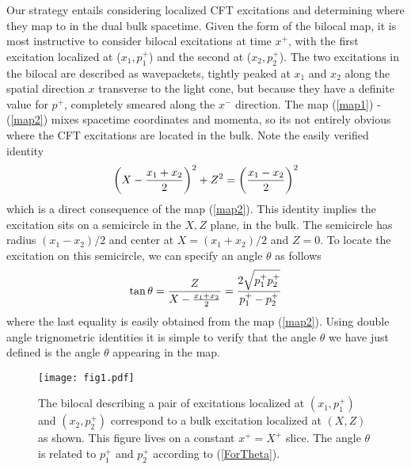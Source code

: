 \documentclass[a4paper,12pt]{article}
\def\bea{\begin{eqnarray}}
\def\eea{\end{eqnarray}}
\begin{document}
Our strategy entails considering localized CFT excitations and determining where they map to in the dual bulk spacetime.
Given the form of the bilocal map, it is most instructive to consider bilocal excitations at time $x^+$, with the first 
excitation localized at ($x_1,p_1^+$) and the second at ($x_2,p_2^+$).
The two excitations in the bilocal are described as wavepackets, tightly peaked at $x_1$ and $x_2$ along the spatial 
direction $x$ transverse to the light cone, but because they have a definite value for $p^+$, completely smeared along 
the  $x^-$ direction.
The map (\ref{map1}) - (\ref{map2}) mixes spacetime coordinates and momenta, so its not entirely obvious where
the CFT excitations are located in the bulk. 
Note the easily verified identity
%
\begin{equation}
\left(X-{x_1+x_2\over 2}\right)^2+Z^2 = \left({x_1-x_2\over 2}\right)^2
\end{equation}
%
which is a direct consequence of the map (\ref{map2}).
This identity implies the excitation sits on a semicircle in the $X,Z$ plane, in the bulk.
The semicircle has radius $(x_1-x_2)/2$ and center at $X=(x_1+x_2)/2$ and $Z=0$.
To locate the excitation on this semicircle, we can specify an angle $\theta$ as follows
%
\bea
\tan\theta={Z\over X-{x_1+x_2\over 2}}={2\sqrt{p_1^+p_2^+}\over p_1^+-p_2^+}
\label{ForTheta}
\eea
%
where the last equality is easily obtained from the map (\ref{map2}).
Using double angle trignometric identities it is simple to verify that the angle $\theta$ we have just defined is the angle 
$\theta$ appearing in the map.
%
\begin{figure}[h]%
\begin{center}
\texttt{[image: fig1.pdf]}%
\caption{The bilocal describing a pair of excitations localized at $(x_1,p_1^+)$ and $(x_2,p_2^+)$ correspond to a 
bulk excitation localized at $(X,Z)$ as shown.
This figure lives on a constant $x^+=X^+$ slice.
The angle $\theta$ is related to $p_1^+$ and $p_2^+$ according to (\ref{ForTheta}).}
\label{fig:ToBulk}
\end{center}
\end{figure}
\end{document}
